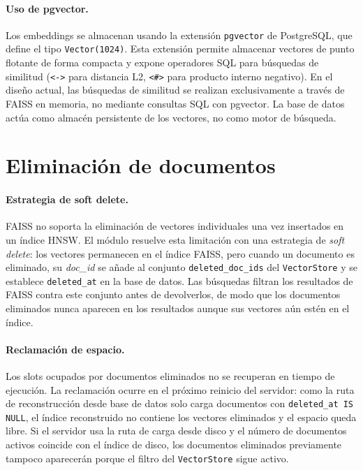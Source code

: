 \documentclass[11pt]{article}
\begin{document}
\paragraph{Uso de pgvector.}
Los embeddings se almacenan usando la extensión \texttt{pgvector} de PostgreSQL, que define
el tipo \texttt{Vector(1024)}. Esta extensión permite almacenar vectores de punto flotante de
forma compacta y expone operadores SQL para búsquedas de similitud
(\texttt{<->} para distancia L2, \texttt{<\#>} para producto interno negativo). En el diseño
actual, las búsquedas de similitud se realizan exclusivamente a través de FAISS en memoria,
no mediante consultas SQL con pgvector. La base de datos actúa como almacén persistente de
los vectores, no como motor de búsqueda.

\section{Eliminación de documentos}

\paragraph{Estrategia de soft delete.}
FAISS no soporta la eliminación de vectores individuales una vez insertados en un índice HNSW.
El módulo resuelve esta limitación con una estrategia de \emph{soft delete}: los vectores
permanecen en el índice FAISS, pero cuando un documento es eliminado, su \emph{doc\_id} se
añade al conjunto \texttt{deleted\_doc\_ids} del \texttt{VectorStore} y se establece
\texttt{deleted\_at} en la base de datos. Las búsquedas filtran los resultados de FAISS
contra este conjunto antes de devolverlos, de modo que los documentos eliminados nunca
aparecen en los resultados aunque sus vectores aún estén en el índice.

\paragraph{Reclamación de espacio.}
Los slots ocupados por documentos eliminados no se recuperan en tiempo de ejecución. La
reclamación ocurre en el próximo reinicio del servidor: como la ruta de reconstrucción desde
base de datos solo carga documentos con \texttt{deleted\_at IS NULL}, el índice reconstruido
no contiene los vectores eliminados y el espacio queda libre. Si el servidor usa la ruta de
carga desde disco y el número de documentos activos coincide con el índice de disco, los
documentos eliminados previamente tampoco aparecerán porque el filtro del \texttt{VectorStore}
sigue activo.
\end{document}
